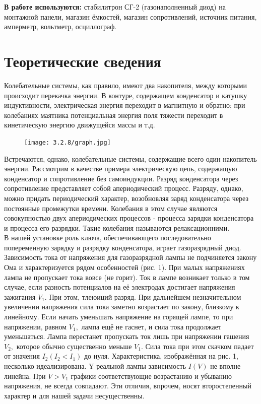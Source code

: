 \documentclass[a4paper,12pt]{article} %
\begin{document}
\textbf{В работе используются:} стабилитрон СГ-2 (газонаполненный диод) на монтажной панели, магазин ёмкостей, магазин сопротивлений, источник питания, амперметр, вольтметр, осциллограф.

\section{Теоретические сведения}

 Колебательные системы, как правило, имеют два накопителя, между которыми происходит перекачка энергии. В контуре, содержащем конденсатор и катушку индуктивности, электрическая энергия переходит в магнитную и обратно; при колебаниях маятника потенциальная энергия поля тяжести переходит в кинетическую энергию движущейся массы и т.д. 

\begin{figure} 
\begin{center}
\texttt{[image: 3.2.8/graph.jpg]} 
\caption{}
\end{center}
\end{figure}

Встречаются, однако, колебательные системы, содержащие всего один накопитель энергии. Рассмотрим в качестве примера электрическую цепь, содержащую конденсатор и сопротивление без самоиндукции. Разряд конденсатора через сопротивление представляет собой апериодический процесс. Разряду, однако, можно придать периодический характер, возобновляя заряд конденсатора через постоянные промежутки времени. Колебания в этом случае являются совокупностью двух апериодических процессов - процесса зарядки конденсатора и процесса его разрядки. Такие колебания называются релаксационними.\\
В нашей установке роль ключа, обеспечивающего последовательно попеременную зарядку и разрядку конденсатора, играет газоразрядный диод. Зависимость тока от напряжения для газоразрядной лампы не подчиняется закону Ома и характеризуется рядом особенностей (рис. 1). При малых напряжениях лампа не пропускает тока вовсе (не горит). Ток в лампе возникает только в том случае, если разность потенциалов на её электродах достигает напряжения зажигания $V_{1} .$ При этом, тлеюиций разряд. При дальнейшем незначительном увеличении напряжения сила тока заметно возрастает по закону, близкому к линейному. 
Если начать уменьшать напряжение на горящей лампе, то при напряжении, равном $V_{1},$ лампа ещё не гаснет, и сила тока продолжает уменьшаться. Лампа перестанет пропускать ток лишь при напряжении гашения $V_{2},$ которое обычно существенно меньше $V_{1}$. Сила тока при этом скачком падает от значения $I_{2}\left(I_{2}<I_{1}\right)$ до нуля. Характеристика, изображённая на рис. 1, несколько идеализирована. $\mathrm{Y}$ реальной лампы зависимость $I(V)$ не вполне линейна. При $V>V_{1}$ графики
соответствующие возрастанию и убыванию напряжения, не всегда совпадают. Эти отличия, впрочем, носят второстепенный характер и для нашей задачи несущественны.
\end{document}
